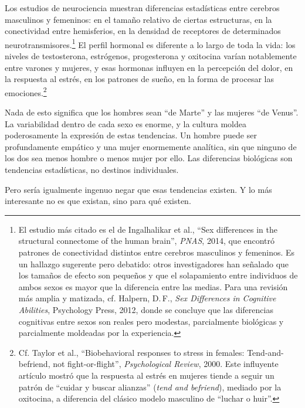 Los estudios de neurociencia muestran diferencias estadísticas entre cerebros masculinos y femeninos: en el tamaño relativo de ciertas estructuras, en la conectividad entre hemisferios, en la densidad de receptores de determinados neurotransmisores.\footnote{El estudio más citado es el de Ingalhalikar et al., ``Sex differences in the structural connectome of the human brain'', \textit{PNAS}, 2014, que encontró patrones de conectividad distintos entre cerebros masculinos y femeninos. Es un hallazgo sugerente pero debatido: otros investigadores han señalado que los tamaños de efecto son pequeños y que el solapamiento entre individuos de ambos sexos es mayor que la diferencia entre las medias. Para una revisión más amplia y matizada, cf. Halpern, D.\,F., \textit{Sex Differences in Cognitive Abilities}, Psychology Press, 2012, donde se concluye que las diferencias cognitivas entre sexos son reales pero modestas, parcialmente biológicas y parcialmente moldeadas por la experiencia.} El perfil hormonal es diferente a lo largo de toda la vida: los niveles de testosterona, estrógenos, progesterona y oxitocina varían notablemente entre varones y mujeres, y esas hormonas influyen en la percepción del dolor, en la respuesta al estrés, en los patrones de sueño, en la forma de procesar las emociones.\footnote{Cf. Taylor et al., ``Biobehavioral responses to stress in females: Tend-and-befriend, not fight-or-flight'', \textit{Psychological Review}, 2000. Este influyente artículo mostró que la respuesta al estrés en mujeres tiende a seguir un patrón de ``cuidar y buscar alianzas'' (\textit{tend and befriend}), mediado por la oxitocina, a diferencia del clásico modelo masculino de ``luchar o huir''.}

Nada de esto significa que los hombres sean ``de Marte'' y las mujeres ``de Venus''. La variabilidad dentro de cada sexo es enorme, y la cultura moldea poderosamente la expresión de estas tendencias. Un hombre puede ser profundamente empático y una mujer enormemente analítica, sin que ninguno de los dos sea menos hombre o menos mujer por ello. Las diferencias biológicas son tendencias estadísticas, no destinos individuales.

Pero sería igualmente ingenuo negar que esas tendencias existen. Y lo más interesante no es que existan, sino para qué existen.

